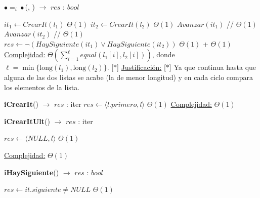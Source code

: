 \begin{Algoritmos}
	
\begin{algorithm}[H]{\textbf{$\bullet =_i \bullet$}(, ) $\to$ $res$ : $bool$}
	\begin{algorithmic}[1]
			\State $it_1 \gets CrearIt(l_1)$	\Comment $\Theta(1)$
			\State $it_2 \gets CrearIt(l_2)$ 	\Comment $\Theta(1)$	
			  \Comment [$\ast$]
			 	\State $Avanzar(it_1)$ // $\Theta(1)$
				\State $Avanzar(it_2)$	// $\Theta(1)$
			\EndWhile
			\State $res \gets \neg(HaySiguiente(it_1) \lor HaySiguiente(it_2))$	\Comment $\Theta(1)$ + $\Theta(1)$
		\medskip
		\Statex \underline{Complejidad:} $\displaystyle\Theta\left(\sum_{i=1}^{\ell}{equal(l_1[i],l_2[i])}\right)$, donde $\ell = \min\{\text{long}(l_1),\text{long}(l_2)\}$. [$\ast$]
		\Statex \underline{Justificación:} [$\ast$] Ya que continua hasta que alguna de las dos listas se acabe (la de menor longitud) y en cada ciclo compara los elementos de la lista.
    \end{algorithmic}
\end{algorithm}

 
\begin{algorithm}[H]
	\begin{algorithmic}[1]
		\State \textbf{iCrearIt}() $\to$ $res$ : iter		
			\State $res \gets \langle l.primero, l \rangle$ 	\Comment $\Theta(1)$
		\medskip
		\Statex \underline{Complejidad:} $\Theta(1)$
    \end{algorithmic}
\end{algorithm}	

\begin{algorithm}[H]
	\begin{algorithmic}[1]
		\State \textbf{iCrearItUlt}() $\to$ $res$ : iter
		
			\State $res \gets \langle NULL, l \rangle$	\Comment $\Theta(1)$
    	
		\medskip
		\Statex \underline{Complejidad:} $\Theta(1)$
    \end{algorithmic}
\end{algorithm}	

\begin{algorithm}[H]
	\begin{algorithmic}[1]
		\State \textbf{iHaySiguiente}() $\to$ $res$ : $bool$
		
			\State $res \gets it.siguiente \neq NULL$	\Comment $\Theta(1)$


\end{algorithmic}
\end{algorithm}
\end{Algoritmos}

